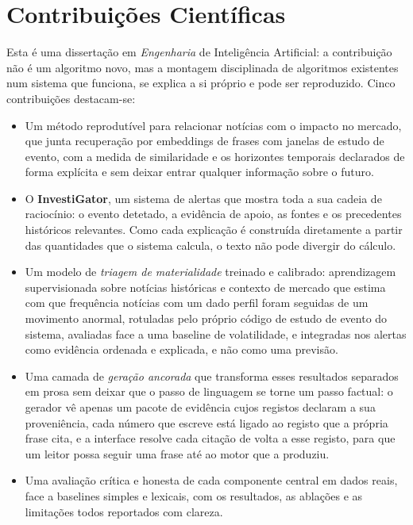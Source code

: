 \section{Contribuições Científicas}
\label{sec:intro_contributions}

Esta é uma dissertação em \emph{Engenharia} de Inteligência Artificial: a contribuição não é um algoritmo
novo, mas a montagem disciplinada de algoritmos existentes num sistema que funciona, se explica a si próprio
e pode ser reproduzido. Cinco contribuições destacam-se:

\begin{itemize}
  \item Um método reprodutível para relacionar notícias com o impacto no mercado, que junta recuperação por
        embeddings de frases com janelas de estudo de evento, com a medida de similaridade e os horizontes
        temporais declarados de forma explícita e sem deixar entrar qualquer informação sobre o futuro.
  \item O \textbf{InvestiGator}, um sistema de alertas que mostra toda a sua cadeia de raciocínio: o evento
        detetado, a evidência de apoio, as fontes e os precedentes históricos relevantes. Como cada
        explicação é construída diretamente a partir das quantidades que o sistema calcula, o texto não pode
        divergir do cálculo.
  \item Um modelo de \emph{triagem de materialidade} treinado e calibrado: aprendizagem supervisionada sobre
        notícias históricas e contexto de mercado que estima com que frequência notícias com um dado perfil
        foram seguidas de um movimento anormal, rotuladas pelo próprio código de estudo de evento do sistema,
        avaliadas face a uma baseline de volatilidade, e integradas nos alertas como evidência ordenada e
        explicada, e não como uma previsão.
  \item Uma camada de \emph{geração ancorada} que transforma esses resultados separados em prosa sem
        deixar que o passo de linguagem se torne um passo factual: o gerador vê apenas um pacote de
        evidência cujos registos declaram a sua proveniência, cada número que escreve está ligado ao
        registo que a própria frase cita, e a interface resolve cada citação de volta a esse registo,
        para que um leitor possa seguir uma frase até ao motor que a produziu.
  \item Uma avaliação crítica e honesta de cada componente central em dados reais, face a baselines simples e
        lexicais, com os resultados, as ablações e as limitações todos reportados com clareza.
\end{itemize}

